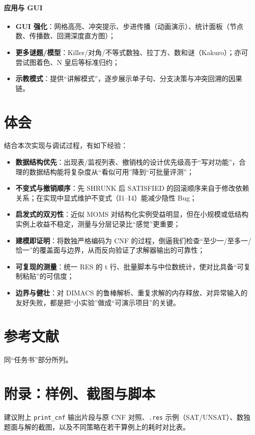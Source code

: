 \documentclass[UTF8]{ctexart}
\begin{document}
\paragraph{应用与 GUI}
\begin{itemize}
  \item \textbf{GUI 强化}：网格高亮、冲突提示、步进传播（动画演示）、统计面板（节点数、传播数、回溯深度直方图）；
  \item \textbf{更多谜题/模型}：Killer/对角/不等式数独、拉丁方、数和谜（Kakuro）；亦可尝试图着色、N 皇后等标准归约；
  \item \textbf{示教模式}：提供“讲解模式”，逐步展示单子句、分支决策与冲突回溯的因果链。
\end{itemize}

\section{体会}
结合本次实现与调试过程，有如下经验：
\begin{itemize}
  \item \textbf{数据结构优先}：出现表/监视列表、撤销栈的设计优先级高于“写对功能”，合理的数据结构能将复杂度从“看似可用”降到“可批量评测”；
  \item \textbf{不变式与撤销顺序}：先 SHRUNK 后 SATISFIED 的回滚顺序来自于修改依赖关系；在实现中显式维护不变式（I1–I4）能减少隐性 Bug；
  \item \textbf{启发式的双刃性}：近似 MOMS 对结构化实例受益明显，但在小规模或低结构实例上收益不稳定，测量与分层记录比“感觉”更重要；
  \item \textbf{建模即证明}：将数独严格编码为 CNF 的过程，倒逼我们检查“至少一/至多一/恰一”的覆盖面与边界，从而反向验证了求解器输出的可靠性；
  \item \textbf{可复现的测量}：统一 RES 的 t 行、批量脚本与中位数统计，使对比具备“可复制粘贴”的可信度；
  \item \textbf{边界与健壮}：对 DIMACS 的鲁棒解析、重复求解的内存释放、对异常输入的友好失败，都是把“小实验”做成“可演示项目”的关键。
\end{itemize}

\section*{参考文献}
同“任务书”部分所列。

\section*{附录：样例、截图与脚本}
建议附上 \texttt{print\_cnf} 输出片段与原 CNF 对照、\texttt{.res} 示例（SAT/UNSAT）、数独题面与解的截图，以及不同策略在若干算例上的耗时对比表。
\end{document}
